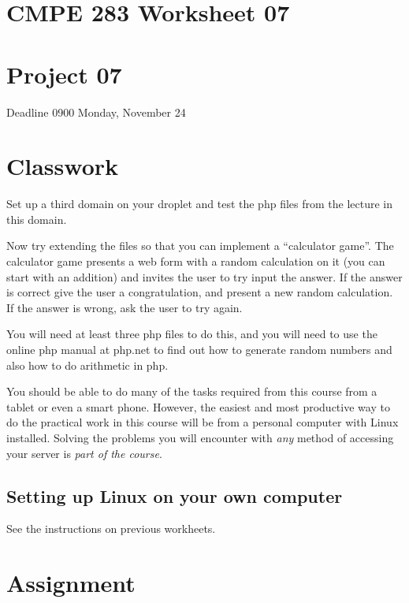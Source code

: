 \documentclass[12pt, a4paper]{article}
\begin{document}

\section*{CMPE 283 Worksheet 07}
\section*{Project 07} 
Deadline 0900 Monday, November 24


\section*{Classwork}
Set up a third domain on your droplet and test the php files from the lecture in this domain.

Now try extending the files so that you can implement a ``calculator game''. The calculator game presents a web form with a random calculation on it (you can start with an addition) and invites the user to try input the answer. If the answer is correct give the user a congratulation, and present a new random calculation. If the answer is wrong, ask the user to try again.

You will need at least three php files to do this, and you will need to use the online php manual at php.net to find out how to generate random numbers and also how to do arithmetic in php.

You should be able to do many of the tasks required from this course from a tablet or even a smart phone. However, the easiest and most productive way to do the practical work in this course will be from a personal computer with Linux installed. Solving the problems you will encounter with \emph{any} method of accessing your server is \emph{part of the course}.

\subsection*{Setting up Linux on your own computer}

See the instructions on previous workheets.


\section*{Assignment}
\end{document}
